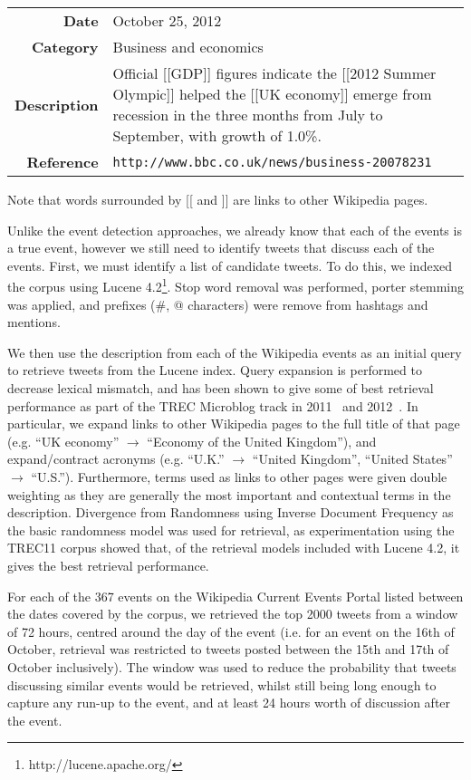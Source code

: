 {
\begin{tabulary}{\textwidth}{r L}
\textbf{Date} & October 25, 2012\\
\textbf{Category} & Business and economics\\
\textbf{Description} & Official [[GDP]] figures indicate the [[2012 Summer Olympic]] helped the [[UK economy]] emerge from recession in the three months from July to September, with growth of 1.0\%. \\
\textbf{Reference} & \texttt{http://www.bbc.co.uk/news/business-20078231}\\
\end{tabulary}
}

Note that words surrounded by [[ and ]] are links to other Wikipedia pages.

Unlike the event detection approaches, we already know that each of the events is a true event, however we still need to identify tweets that discuss each of the events.
First, we must identify a list of candidate tweets.
To do this, we indexed the corpus using Lucene 4.2\footnote{http://lucene.apache.org/}.
Stop word removal was performed, porter stemming was applied, and prefixes (\#, @ characters) were remove from hashtags and mentions.

We then use the description from each of the Wikipedia events as an initial query to retrieve tweets from the Lucene index.
Query expansion is performed to decrease lexical mismatch, and has been shown to give some of best retrieval performance as part of the TREC Microblog track in 2011~\citep{gambosi2011fub,ferguson2011clarity,li2011pris} and 2012~\citep{kimovercoming,younosFreq,hanhit}.
In particular, we expand links to other Wikipedia pages to the full title of that page (e.g. ``UK economy'' \(\to\) ``Economy of the United Kingdom''), and expand/contract acronyms (e.g. ``U.K.'' \(\to\) ``United Kingdom'', ``United States'' \(\to\) ``U.S.'').
Furthermore, terms used as links to other pages were given double weighting as they are generally the most important and contextual terms in the description.
Divergence from Randomness using Inverse Document Frequency as the basic randomness model was used for retrieval, as experimentation using the TREC11 corpus showed that, of the retrieval models included with Lucene 4.2, it gives the best retrieval performance.

For each of the 367 events on the Wikipedia Current Events Portal listed between the dates covered by the corpus, we retrieved the top 2000 tweets from a window of 72 hours, centred around the day of the event (i.e. for an event on the 16th of October, retrieval was restricted to tweets posted between the 15th and 17th of October inclusively).
The window was used to reduce the probability that tweets discussing similar events would be retrieved, whilst still being long enough to capture any run-up to the event, and at least 24 hours worth of discussion after the event.


